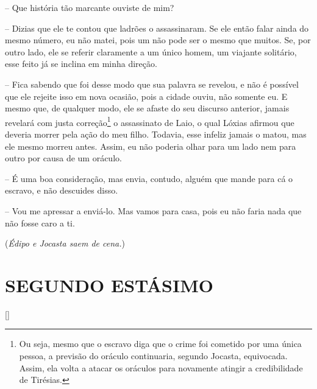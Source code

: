  --   Que história tão marcante ouviste de mim?

 --   Dizias que ele te contou que ladrões o assassinaram. Se ele então falar
ainda do mesmo número, eu não matei, pois um não pode ser o mesmo que
muitos. Se, por outro lado, ele se referir claramente a um único homem,
um viajante solitário, esse feito já se inclina em minha direção.

 --   Fica sabendo que foi desse modo que sua palavra se revelou, e não é
possível  que ele rejeite isso em nova ocasião, pois a cidade
ouviu, não somente eu. E mesmo que, de qualquer modo, ele se afaste do
seu discurso anterior, jamais revelará com justa correção\footnote{Ou
  seja, mesmo que o escravo diga que o crime foi cometido por uma única
  pessoa, a previsão do oráculo continuaria, segundo Jocasta,
  equivocada. Assim, ela volta a atacar os oráculos para novamente
  atingir a credibilidade de Tirésias.} o assassinato de Laio, o qual
Lóxias afirmou que deveria morrer pela ação do meu filho. Todavia, esse
infeliz jamais o matou, mas ele mesmo morreu antes. Assim, eu não
poderia olhar para um lado nem para outro por causa de um oráculo.

 --   É uma boa consideração, mas envia, contudo, alguém que mande para cá o
 escravo, e não descuides disso.

 --   Vou me apressar a enviá-lo. Mas vamos para casa, pois eu não faria nada
que não fosse caro a ti.

(\emph{Édipo e Jocasta saem de cena.})

\section{SEGUNDO ESTÁSIMO}


\hfill [] 

